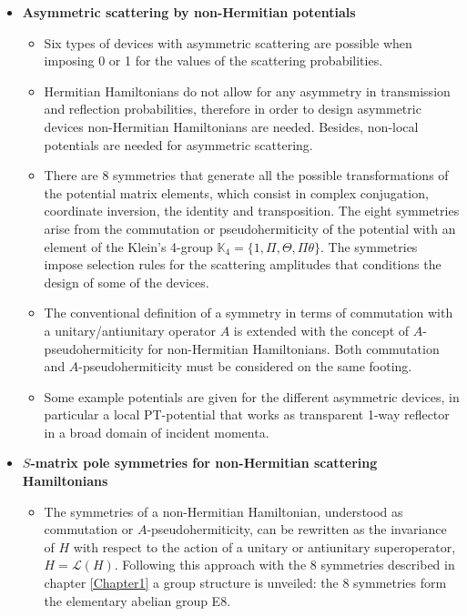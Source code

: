 \begin{itemize}
  \item {\bf Asymmetric scattering by non-Hermitian potentials}
  \begin{itemize}
    \item Six types of devices with asymmetric scattering are possible when imposing 0 or 1 for the values of the scattering probabilities.

    \item Hermitian Hamiltonians do not allow for any asymmetry in transmission and
    reflection probabilities, therefore in order to design asymmetric devices non-Hermitian
    Hamiltonians are needed. Besides, non-local potentials are needed for asymmetric scattering.

    \item There are 8 symmetries that generate all the possible transformations of the potential matrix elements, which consist in complex conjugation, coordinate inversion, the identity and transposition. The eight symmetries arise from the commutation or pseudohermiticity of the potential with an element of the Klein’s 4-group $\mathbb{K}_4 = \{1,\Pi,\Theta,\Pi\theta\}$. The symmetries impose selection rules for the scattering amplitudes that conditions the design of some of the devices.

    \item The conventional definition of a symmetry in terms of commutation with a unitary/antiunitary operator $A$ is extended with the concept of $A$-pseudohermiticity for non-Hermitian Hamiltonians. Both commutation and $A$-pseudohermiticity must be considered on the same footing.

    \item Some example potentials are given for the different asymmetric devices, in particular a local PT-potential that works as transparent 1-way reflector in a broad domain of incident momenta.

  \end{itemize}

  \item {\bf $S$-matrix pole symmetries for non-Hermitian scattering Hamiltonians}
  \begin{itemize}
    \item The symmetries of a non-Hermitian Hamiltonian, understood as commutation or $A$-pseudohermiticity, can be rewritten as the invariance of $H$ with respect to the action of a unitary or antiunitary superoperator, $H = \mathcal{L}(H)$. Following this approach with the 8 symmetries described in chapter \ref{Chapter1} a group structure is unveiled: the 8 symmetries form the elementary abelian group E8.


\end{itemize}
\end{itemize}
